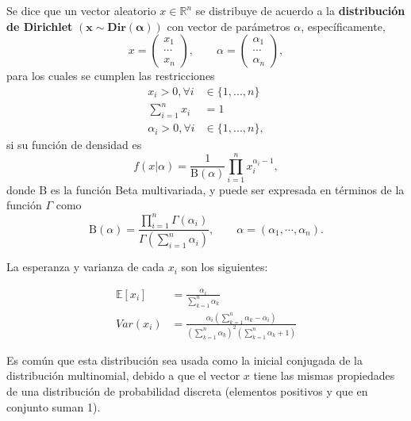\begin{defin}
    Se dice que un vector aleatorio $x \in \mathbb{R}^n$ se distribuye de acuerdo a la \textbf{distribuci\'on de Dirichlet}  $\mathbf{(x \sim Dir(\alpha))}$ con vector de par\'ametros $\alpha$, espec\'ificamente,
    \begin{equation*}
        x = 
        \left(\begin{array}{c}
            x_1  \\
            \cdots \\
            x_n
        \end{array}\right),
        \qquad
        \alpha = 
        \left(\begin{array}{c}
            \alpha_1  \\
            \cdots \\
            \alpha_n
        \end{array}\right),
    \end{equation*}
    para los cuales se cumplen las restricciones
    \begin{equation*}
    \begin{aligned}
        x_i > 0, \forall i &\in \{1,...,n\} \\
        \sum_{i=1}^n x_i &= 1 \\
        \alpha_i > 0, \forall i &\in \{1,...,n\},
    \end{aligned}
    \end{equation*}
    si su funci\'on de densidad  es
    \begin{equation*}
        f(x|\alpha) = 
        \frac {1}{\mathrm {B} (\alpha)}
        \prod _{i=1}^{n}x_{i}^{\alpha _{i}-1},
    \end{equation*}
    donde $\mathrm{B}$ es la funci\'on Beta multivariada, y puede ser expresada en t\'erminos de la funci\'on $\Gamma$ como 
    \begin{equation*}
       \mathrm{B}(\alpha)=
       \frac {\prod _{i=1}^{n}\Gamma (\alpha _{i})}
       {\Gamma \left(\sum _{i=1}^{n}\alpha _{i}\right)},
       \qquad 
       \alpha =(\alpha _1,\cdots ,\alpha _n). 
    \end{equation*}
    
    La esperanza y varianza de cada $x_i$ son los siguientes:
    
    \begin{equation*}
    \begin{aligned}
        \mathbb{E}[x_i] &= \frac{\alpha_i}{\sum_{k=1}^n \alpha_k} \\
        Var(x_i) &= \frac
        {\alpha_i \left( \sum_{k=1}^n \alpha_k - \alpha_i \right)}
        {\left( \sum_{k=1}^n \alpha_k \right)^2 \left( \sum_{k=1}^n \alpha_k + 1 \right)}
    \end{aligned}
    \end{equation*}
    
\end{defin}
Es com\'un que esta distribuci\'on sea usada como la inicial conjugada de la distribuci\'on multinomial, debido a que el vector $x$ tiene las mismas propiedades de una distribuci\'on de probabilidad discreta (elementos positivos y que en conjunto suman 1).

